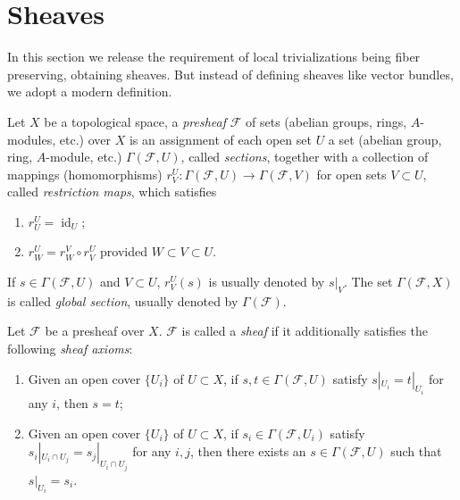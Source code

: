 \section{Sheaves}

In this section we release the requirement of local trivializations being fiber preserving, obtaining sheaves.
But instead of defining sheaves like vector bundles, we adopt a modern definition.

\begin{defn}
    Let $X$ be a topological space, a \emph{presheaf} $\mathcal{F}$ of sets (abelian groups, rings, $A$-modules, etc.) over $X$ is an assignment of each open set $U$ a set (abelian group, ring, $A$-module, etc.) $\Gamma(\mathcal{F},U)$, called \emph{sections}, together with a collection of mappings (homomorphisms) $r^U_V:\Gamma(\mathcal{F},U)\to\Gamma(\mathcal{F},V)$ for open sets $V\subset U$, called \emph{restriction maps}, which satisfies
    \begin{enumerate}[(1)]
        \item $r^U_U=\operatorname{id}_U$;
        \item $r^U_W=r^V_W\circ r^U_V$ provided $W\subset V\subset U$.
    \end{enumerate}
    If $s\in\Gamma(\mathcal{F},U)$ and $V\subset U$, $r^U_V(s)$ is usually denoted by $s|_V$.
    The set $\Gamma(\mathcal{F},X)$ is called \emph{global section}, usually denoted by $\Gamma(\mathcal{F})$.
\end{defn}

\begin{defn}
    Let $\mathcal{F}$ be a presheaf over $X$.
    $\mathcal{F}$ is called a \emph{sheaf} if it additionally satisfies the following \emph{sheaf axioms}:
    \begin{enumerate}[(1)]
        \item Given an open cover $\{U_i\}$ of $U\subset X$, if $s,t\in\Gamma(\mathcal{F},U)$ satisfy $s|_{U_i}=t|_{U_i}$ for any $i$, then $s=t$;
        \item Given an open cover $\{U_i\}$ of $U\subset X$, if $s_i\in\Gamma(\mathcal{F},U_i)$ satisfy $s_i|_{U_i\cap U_j}=s_j|_{U_i\cap U_j}$ for any $i,j$, then there exists an $s\in\Gamma(\mathcal{F},U)$ such that $s|_{U_i}=s_i$.
    \end{enumerate}
\end{defn}

